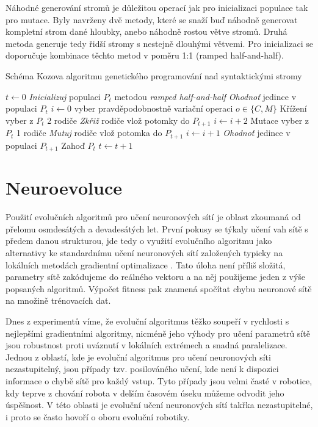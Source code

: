 \documentclass[12pt,fleqn,a4paper,proc]{article}
\begin{document}
Náhodné generování stromů je důležitou operací jak pro inicializaci populace tak pro mutace. Byly navrženy dvě metody, které se snaží buď náhodně generovat kompletní strom dané hloubky, anebo náhodně rostou větve stromů. Druhá metoda generuje tedy řidší stromy s nestejně dlouhými větvemi. Pro inicializaci se doporučuje kombinace těchto metod v poměru 1:1 (ramped half-and-half).

\begin{algorithm}
\caption{Schéma Kozova algoritmu genetického programování nad syntaktickými stromy}
\label{obrsgp}
\begin{algorithmic}
\State $t \gets 0$
\State \emph{Inicializuj} populaci $P_t$ metodou \emph{ramped half-and-half}
\State \emph{Ohodnoť} jedince v populaci $P_t$
\State $i \gets 0$
\Repeat
\State vyber pravděpodobnostně variační operaci $o\in\{C,M\}$
 \Comment Křížení
\State vyber z $P_t$ 2 rodiče
\State \emph{Zkřiž} rodiče
\State vlož potomky do $P_{t+1}$
\State $i \gets i + 2$
\Else \Comment Mutace
\State vyber z $P_t$ 1 rodiče
\State \emph{Mutuj} rodiče
\State vlož potomka do $P_{t+1}$
\State $i \gets i + 1$
\EndIf
{}
\State \emph{Ohodnoť} jedince v populaci $P_{t+1}$
\State 	Zahoď $P_t$
\State $t \gets t+1$
\EndWhile
\EndProcedure
\end{algorithmic}
\end{algorithm}


\section{Neuroevoluce}
 
Použití evolučních algoritmů pro učení neuronových sítí je oblast zkoumaná od přelomu osmdesátých a devadesátých let. První pokusy se týkaly učení vah sítě s předem danou strukturou, jde tedy o využití evolučního algoritmu jako alternativy ke standardnímu učení neuronových sítí založených typicky na lokálních metodách gradientní optimalizace \cite{neuro}. 
Tato úloha není příliš složitá, parametry sítě zakódujeme do reálného vektoru a na něj použijeme jeden z výše popsaných algoritmů. Výpočet fitness pak znamená spočítat chybu neuronové sítě na množině trénovacích dat.

Dnes z experimentů víme, že evoluční algoritmus těžko soupeří v rychlosti s nejlepšími gradientními algoritmy, nicméně jeho výhody pro učení parametrů sítě jsou robustnost proti uváznutí v lokálních extrémech a snadná paralelizace. Jednou z oblastí, kde je evoluční algoritmus pro učení neuronových síti nezastupitelný, jsou případy tzv. posilováného učení, kde není k dispozici informace o chybě sítě pro každý vstup. Tyto případy jsou velmi časté v robotice, kdy teprve z chování robota v delším časovém úseku můžeme odvodit jeho úspěšnost. V této oblasti je evoluční učení neuronových sítí takřka nezastupitelné, i proto se často hovoří o oboru evoluční robotiky. 
\end{document}
